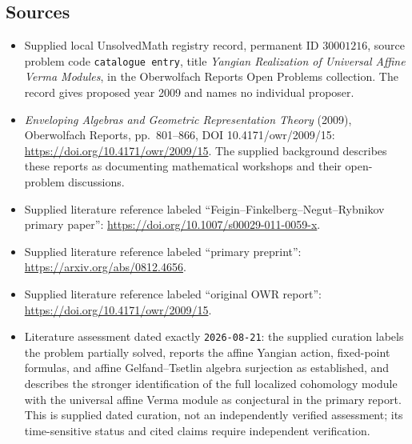 \documentclass[11pt]{article}
\begin{document}
\subsection{Sources}
\begin{itemize}
\item Supplied local UnsolvedMath registry record, permanent ID \(30001216\), source problem code \texttt{catalogue entry}, title \emph{Yangian Realization of Universal Affine Verma Modules}, in the Oberwolfach Reports Open Problems collection. The record gives proposed year 2009 and names no individual proposer.
\item \emph{Enveloping Algebras and Geometric Representation Theory} (2009), Oberwolfach Reports, pp.\ 801--866, DOI 10.4171/owr/2009/15: \url{https://doi.org/10.4171/owr/2009/15}. The supplied background describes these reports as documenting mathematical workshops and their open-problem discussions.
\item Supplied literature reference labeled ``Feigin--Finkelberg--Negut--Rybnikov primary paper'': \url{https://doi.org/10.1007/s00029-011-0059-x}.
\item Supplied literature reference labeled ``primary preprint'': \url{https://arxiv.org/abs/0812.4656}.
\item Supplied literature reference labeled ``original OWR report'': \url{https://doi.org/10.4171/owr/2009/15}.
\item Literature assessment dated exactly \texttt{2026-08-21}: the supplied curation labels the problem partially solved, reports the affine Yangian action, fixed-point formulas, and affine Gelfand--Tsetlin algebra surjection as established, and describes the stronger identification of the full localized cohomology module with the universal affine Verma module as conjectural in the primary report. This is supplied dated curation, not an independently verified assessment; its time-sensitive status and cited claims require independent verification.
\end{itemize}
\end{document}
